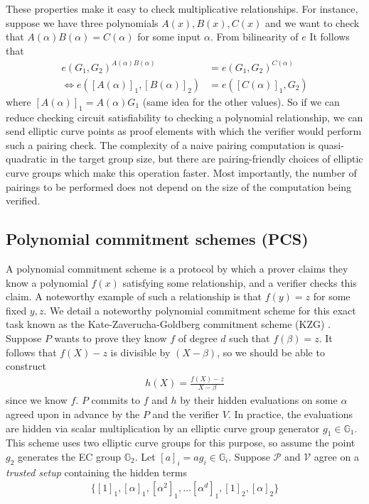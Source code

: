 These properties make it easy to check multiplicative relationships. For instance, suppose we have three polynomials $A(x), B(x), C(x)$ and we want to check that $A(\alpha)B(\alpha) = C(\alpha)$ for some input $\alpha$. From bilinearity of $e$ It follows that 
\begin{align}
e(G_1, G_2)^{A(\alpha)B(\alpha)} &= e(G_1, G_2)^{C(\alpha)} \\
\Leftrightarrow e([A(\alpha)]_1, [B(\alpha)]_2) &= e([C(\alpha)]_1, G_2)
\end{align}
where $[A(\alpha)]_1 = A(\alpha)G_1$ (same idea for the other values). So if we can reduce checking circuit satisfiability to checking a polynomial relationship, we can send elliptic curve points as proof elements with which the verifier would perform such a pairing check. The complexity of a naive pairing computation is quasi-quadratic in the target group size, but there are pairing-friendly choices of elliptic curve groups which make this operation faster. Most importantly, the number of pairings to be performed does not depend on the size of the computation being verified.

\subsection{Polynomial commitment schemes (PCS)}

\noindent A polynomial commitment scheme is a protocol by which a prover claims they know a polynomial $f(x)$ satisfying some relationship, and a verifier checks this claim. A noteworthy example of such a relationship is that $f(y) = z$ for some fixed $y, z$. We detail a noteworthy polynomial commitment scheme for this exact task known as the Kate-Zaverucha-Goldberg commitment scheme (KZG) \cite{kzg}. Suppose $P$ wants to prove they know $f$ of degree $d$ such that $f(\beta) = z$. It follows that $f(X) - z$ is divisible by $(X - \beta)$, so we should be able to construct
\begin{align}
h(X) = \frac{f(X) - z}{X - \beta}
\end{align}
since we know $f$. $P$ commits to $f$ and $h$ by their hidden evaluations on some $\alpha$ agreed upon in advance by the $P$ and the verifier $V$. In practice, the evaluations are hidden via scalar multiplication by an elliptic curve group generator $g_1 \in \mathbb{G}_1$. This scheme uses two elliptic curve groups for this purpose, so assume the point $g_2$ generates the EC group $\mathbb{G}_2$. Let $[a]_i = ag_i \in \mathbb{G}_i$. Suppose $\mathcal{P}$ and $\mathcal{V}$ agree on a \textit{trusted setup} containing the hidden terms 
\begin{align}
\{[1]_1, [\alpha]_1, [\alpha^2]_1, \dots [\alpha^{d}]_1, [1]_2, [\alpha]_2\}
\end{align}


